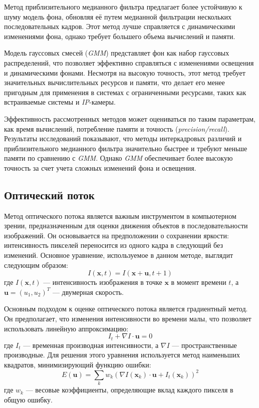 Метод приблизительного медианного фильтра предлагает более устойчивую к шуму модель фона, обновляя её путем медианной фильтрации нескольких последовательных кадров. Этот метод лучше справляется с динамическими изменениями фона, однако требует большего объема вычислений и памяти.

Модель гауссовых смесей (\textit{GMM}) представляет фон как набор гауссовых распределений, что позволяет эффективно справляться с изменениями освещения и динамическими фонами. Несмотря на высокую точность, этот метод требует значительных вычислительных ресурсов и памяти, что делает его менее пригодным для применения в системах с ограниченными ресурсами, таких как встраиваемые системы и \textit{IP}-камеры.

Эффективность рассмотренных методов может оцениваться по таким параметрам, как время вычислений, потребление памяти и точность (\textit{precision/recall}). Результаты исследований \cite{Brutzer2011EvaluationOB} показывают, что методы интеркадровых различий и приблизительного медианного фильтра значительно быстрее и требуют меньше памяти по сравнению с \textit{GMM}. Однако \textit{GMM} обеспечивает более высокую точность за счет учета сложных изменений фона и освещения.
\subsection{Оптический поток}
Метод оптического потока является важным инструментом в компьютерном зрении, предназначенным для оценки движения объектов в последовательности изображений. Он основывается на предположении о сохранении яркости: интенсивность пикселей переносится из одного кадра в следующий без изменений\cite{fleet}. Основное уравнение, используемое в данном методе, выглядит следующим образом:
\[ I(\mathbf{x}, t) = I(\mathbf{x} + \mathbf{u}, t + 1) \]
где \( I(\mathbf{x}, t) \) — интенсивность изображения в точке \(\mathbf{x}\) в момент времени \( t \), а \(\mathbf{u} = (u_1, u_2)^T \) — двумерная скорость.

Основным подходом к оценке оптического потока является градиентный метод. Он предполагает, что изменения интенсивности во времени малы, что позволяет использовать линейную аппроксимацию:
\[ I_t + \nabla I \cdot \mathbf{u} = 0 \]
где \( I_t \) — временная производная интенсивности, а \(\nabla I\) — пространственные производные. Для решения этого уравнения используется метод наименьших квадратов, минимизирующий функцию ошибки:
\[ E(\mathbf{u}) = \sum_k w_k (\nabla I(\mathbf{x}_k) \cdot \mathbf{u} + I_t(\mathbf{x}_k))^2 \]
где \( w_k \) — весовые коэффициенты, определяющие вклад каждого пикселя в общую ошибку.

